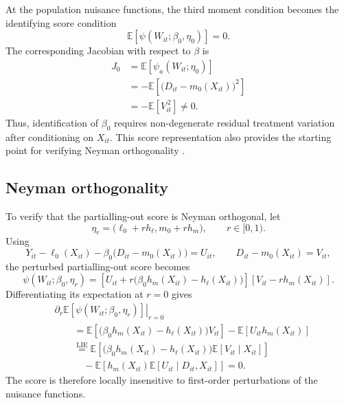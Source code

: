\documentclass[11pt,oneside,a4paper]{book}
\begin{document}
At the population nuisance functions, the third moment condition becomes the identifying score condition
\begin{equation*}
\mathbb{E}\!\left[
\psi(W_{it};\beta_0,\eta_0)
\right]
=0.
\end{equation*}
The corresponding Jacobian with respect to \(\beta\) is
\begin{align*}
J_0
&=
\mathbb{E}\!\left[
\psi_a(W_{it};\eta_0)
\right] \\
&=
-\mathbb{E}\!\left[
\bigl(D_{it}-m_0(X_{it})\bigr)^2
\right] \\
&=
-\mathbb{E}[V_{it}^{\,2}]
\neq 0.
\end{align*}
Thus, identification of \(\beta_0\) requires non-degenerate residual treatment variation after conditioning on \(X_{it}\). This score representation also provides the starting point for verifying Neyman orthogonality \citep{robinson1988rootn,chernozhukov2018dml}.

\subsection[Neyman Orthogonality]{Neyman orthogonality}

To verify that the partialling-out score is Neyman orthogonal, let
\begin{equation*}
\eta_r
=
\bigl(\ell_0+rh_{\ell},m_0+rh_m\bigr),
\qquad
r\in[0,1).
\end{equation*}
Using
\begin{equation*}
Y_{it}-\ell_0(X_{it})
-\beta_0\bigl(D_{it}-m_0(X_{it})\bigr)
=
U_{it},
\qquad
D_{it}-m_0(X_{it})
=
V_{it},
\end{equation*}
the perturbed partialling-out score becomes
\begin{equation*}
\psi(W_{it};\beta_0,\eta_r)
=
\left[
U_{it}+r\bigl(\beta_0h_m(X_{it})-h_{\ell}(X_{it})\bigr)
\right]
\left[
V_{it}-rh_m(X_{it})
\right].
\end{equation*}
Differentiating its expectation at \(r=0\) gives
\begin{align*}
&\left.
\partial_r
\mathbb{E}\!\left[
\psi(W_{it};\beta_0,\eta_r)
\right]
\right|_{r=0} \\
&\qquad =
\mathbb{E}\!\left[
\bigl(\beta_0h_m(X_{it})-h_{\ell}(X_{it})\bigr)V_{it}
\right]
-\mathbb{E}[U_{it}h_m(X_{it})] \\
&\qquad \overset{\mathrm{LIE}}{=}
\mathbb{E}\!\left[
\bigl(\beta_0h_m(X_{it})-h_{\ell}(X_{it})\bigr)
\mathbb{E}[V_{it}\mid X_{it}]
\right] \\
&\qquad\quad-
\mathbb{E}\!\left[
h_m(X_{it})
\mathbb{E}[U_{it}\mid D_{it},X_{it}]
\right]
=0.
\end{align*}
The score is therefore locally insensitive to first-order perturbations of the nuisance functions.
\end{document}
